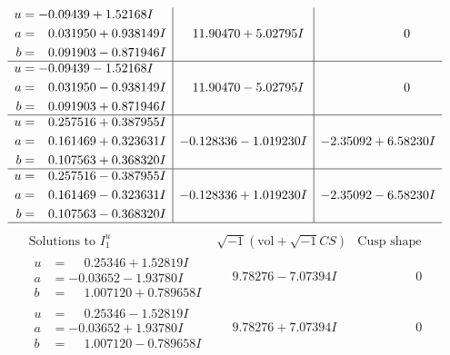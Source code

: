 \documentclass[1p]{elsarticle_modified}
\theoremstyle{definition}
\newcommand{\I}{\sqrt{-1}}
\begin{document}
$$\begin{array}{c|c|c}
\begin{aligned}
u &= -0.09439 + 1.52168 I \\
a &= \phantom{-}0.031950 + 0.938149 I \\
b &= \phantom{-}0.091903 - 0.871946 I\end{aligned}
 & \phantom{-}11.90470 + 5.02795 I & \phantom{-0.000000 } 0 \\ \hline\begin{aligned}
u &= -0.09439 - 1.52168 I \\
a &= \phantom{-}0.031950 - 0.938149 I \\
b &= \phantom{-}0.091903 + 0.871946 I\end{aligned}
 & \phantom{-}11.90470 - 5.02795 I & \phantom{-0.000000 } 0 \\ \hline\begin{aligned}
u &= \phantom{-}0.257516 + 0.387955 I \\
a &= \phantom{-}0.161469 + 0.323631 I \\
b &= \phantom{-}0.107563 + 0.368320 I\end{aligned}
 & -0.128336 - 1.019230 I & -2.35092 + 6.58230 I \\ \hline\begin{aligned}
u &= \phantom{-}0.257516 - 0.387955 I \\
a &= \phantom{-}0.161469 - 0.323631 I \\
b &= \phantom{-}0.107563 - 0.368320 I\end{aligned}
 & -0.128336 + 1.019230 I & -2.35092 - 6.58230 I\\
 \hline 
 \end{array}$$\newpage$$\begin{array}{c|c|c}  
\text{Solutions to }I^u_{1}& \I (\text{vol} + \sqrt{-1}CS) & \text{Cusp shape}\\
 \hline 
\begin{aligned}
u &= \phantom{-}0.25346 + 1.52819 I \\
a &= -0.03652 - 1.93780 I \\
b &= \phantom{-}1.007120 + 0.789658 I\end{aligned}
 & \phantom{-}9.78276 - 7.07394 I & \phantom{-0.000000 } 0 \\ \hline\begin{aligned}
u &= \phantom{-}0.25346 - 1.52819 I \\
a &= -0.03652 + 1.93780 I \\
b &= \phantom{-}1.007120 - 0.789658 I\end{aligned}
 & \phantom{-}9.78276 + 7.07394 I & \phantom{-0.000000 } 0 \\ \hline\begin{aligned}

\end{aligned}
\end{array}$$
\end{document}
